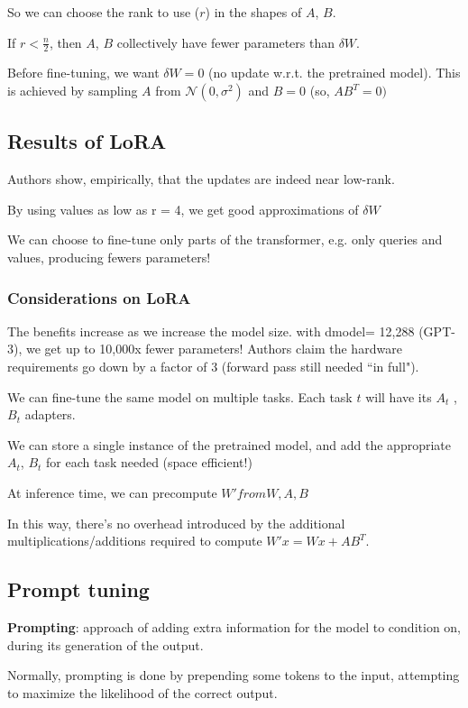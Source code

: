 So we can choose the rank to use ($r$) in the shapes of $A$, $B$.



If $r < \frac{n}{2}$, then $A$, $B$ collectively have fewer parameters than $\delta W$.

Before fine-tuning, we want $\delta W = 0$ (no update w.r.t. the pretrained model). This is achieved by sampling $A$ from $\mathcal{N}(0, \sigma^2)$ and $B = 0$ (so, $AB^T = 0)$


\subsection{Results of LoRA}
Authors show, empirically, that the
updates are indeed near low-rank.

By using values as low as r = 4, we get good approximations of $\delta W$

We can choose to fine-tune only parts of the transformer, e.g. only
queries and values, producing fewers parameters!

\subsubsection{Considerations on LoRA}
The benefits increase as we increase the model size.
with dmodel= 12,288 (GPT-3), we get up to 10,000x fewer parameters!
Authors claim the hardware requirements go down by a factor of 3 (forward pass still needed “in full").

We can fine-tune the same model on multiple tasks. Each task $t$ will have its $A_t$
,$B_t$ adapters.

We can store a single instance of the pretrained model, and add the
appropriate $A_t$, $B_t$ for each task needed (space efficient!)



At inference time, we can precompute $W' from W, A, B$

In this way, there's no overhead introduced by the additional
multiplications/additions required to compute $W'x = Wx + AB^T$.

\subsection{Prompt tuning}

\textbf{Prompting}: approach of adding extra information for the
model to condition on, during its generation of the output.

Normally, prompting is done by prepending some tokens to
the input, attempting to maximize the likelihood of the
correct output.

